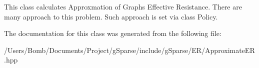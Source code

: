This class calculates Approxmation of Graph\textquotesingle{}s Effective Resistance. There are many approach to this problem. Such approach is set via class Policy. 

The documentation for this class was generated from the following file\+:\begin{DoxyCompactItemize}
\item 
/\+Users/\+Bomb/\+Documents/\+Project/g\+Sparse/include/g\+Sparse/\+E\+R/Approximate\+E\+R.\+hpp\end{DoxyCompactItemize}
